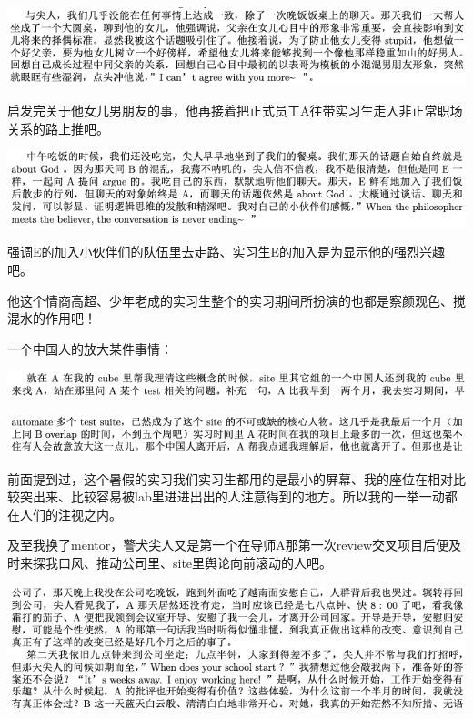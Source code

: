 \documentclass[9pt, b5paper]{article}
\begin{document}
\begin{center}
\includegraphics[width=.9\linewidth]{./pic/backups_plans_20210513_105210.png}
\end{center}

启发完关于他女儿男朋友的事，他再接着把正式员工A往带实习生走入非正常职场关系的路上推吧。

\begin{center}
\includegraphics[width=.9\linewidth]{./pic/backups_plans_20210513_105116.png}
\end{center}

强调E的加入小伙伴们的队伍里去走路、实习生E的加入是为显示他的强烈兴趣吧。

他这个情商高超、少年老成的实习生整个的实习期间所扮演的也都是察颜观色、搅混水的作用吧！

一个中国人的放大某件事情： 

\begin{center}
\includegraphics[width=.9\linewidth]{./pic/backups_plans_20210513_110430.png}
\end{center}

\begin{center}
\includegraphics[width=.9\linewidth]{./pic/backups_plans_20210513_110443.png}
\end{center}

前面提到过，这个暑假的实习我们实习生都用的是最小的屏幕、我的座位在相对比较突出来、比较容易被lab里进进出出的人注意得到的地方。所以我的一举一动都在人们的注视之内。 

及至我换了mentor，警犬尖人又是第一个在导师A那第一次review交叉项目后便及时来探我口风、推动公司里、site里舆论向前滚动的人吧。 

\begin{center}
\includegraphics[width=.9\linewidth]{./pic/backups_plans_20210513_105802.png}
\end{center}
\end{document}
